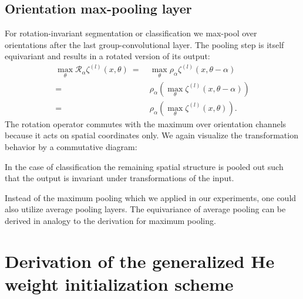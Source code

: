 \documentclass[10pt,twocolumn,letterpaper]{article}
\begin{document}
\subsection{Orientation max-pooling layer}

For rotation-invariant segmentation or classification we max-pool over orientations after the last group-convolutional layer.
The pooling step is itself equivariant and results in a rotated version of its output:
\begin{align*}
	\max_{\theta} \mathcal{R}_\alpha\zeta^{(l)}(x,\theta)\
	=\ & \max_{\theta} \rho_\alpha\zeta^{(l)}(x,\theta-\alpha) \\
	=\ & \rho_{\alpha} \left(\max_{\theta} \zeta^{(l)}(x,\theta-\alpha)\right) \\
	=\ & \rho_{\alpha} \left(\max_{\theta} \zeta^{(l)}(x,\theta)\right).
\end{align*}
The rotation operator commutes with the maximum over orientation channels because it acts on spatial coordinates only.
We again visualize the transformation behavior by a commutative diagram:
\begin{center}
\end{center}
In the case of classification the remaining spatial structure is pooled out such that the output is invariant under transformations of the input.

Instead of the maximum pooling which we applied in our experiments, one could also utilize average pooling layers.
The equivariance of average pooling can be derived in analogy to the derivation for maximum pooling.





\section{Derivation of the generalized He weight initialization scheme}\label{apx:HeWeightDeriv}
\end{document}
